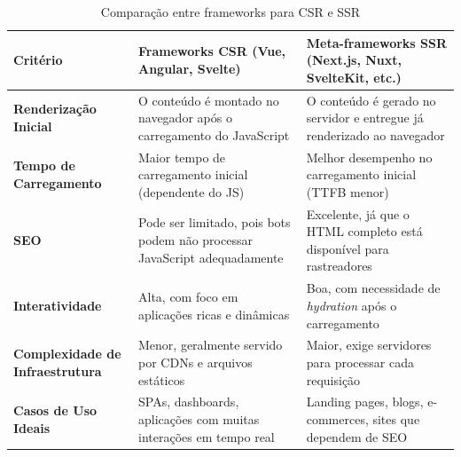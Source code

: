 \begin{table}[H]
\centering
\caption{Comparação entre frameworks para CSR e SSR}
\label{tab:comparativo-frameworks}
\begin{tabular}{|p{3cm}|p{5.5cm}|p{5.5cm}|}
\hline
\textbf{Critério} & \textbf{Frameworks CSR (Vue, Angular, Svelte)} & \textbf{Meta-frameworks SSR (Next.js, Nuxt, SvelteKit, etc.)} \\
\hline
\textbf{Renderização Inicial} & O conteúdo é montado no navegador após o carregamento do JavaScript & O conteúdo é gerado no servidor e entregue já renderizado ao navegador \\
\hline
\textbf{Tempo de Carregamento} & Maior tempo de carregamento inicial (dependente do JS) & Melhor desempenho no carregamento inicial (TTFB menor) \\
\hline
\textbf{SEO} & Pode ser limitado, pois bots podem não processar JavaScript adequadamente & Excelente, já que o HTML completo está disponível para rastreadores \\
\hline
\textbf{Interatividade} & Alta, com foco em aplicações ricas e dinâmicas & Boa, com necessidade de \textit{hydration} após o carregamento \\
\hline
\textbf{Complexidade de Infraestrutura} & Menor, geralmente servido por CDNs e arquivos estáticos & Maior, exige servidores para processar cada requisição \\
\hline
\textbf{Casos de Uso Ideais} & SPAs, dashboards, aplicações com muitas interações em tempo real & Landing pages, blogs, e-commerces, sites que dependem de SEO \\
\hline
\end{tabular}
\end{table}




